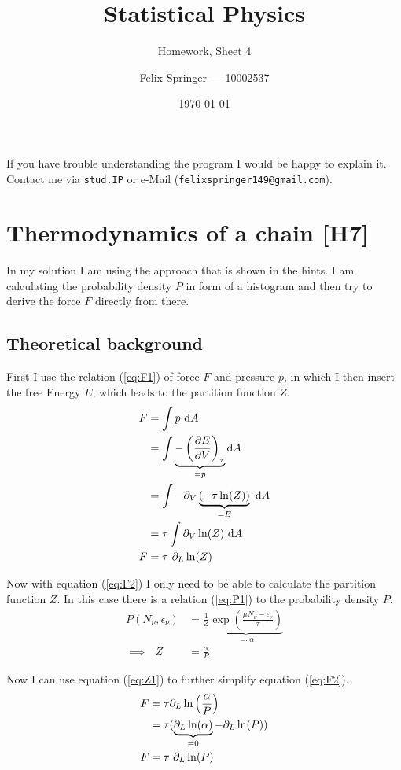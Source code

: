 \documentclass[a4paper,12pt]{scrartcl}
\title{Statistical Physics}
\subtitle{Homework, Sheet 4}
\author{Felix Springer --- 10002537}
\date{\today}
\begin{document}
\maketitle

If you have trouble understanding the program I would be happy to explain it.
Contact me via \texttt{stud.IP} or e-Mail (\texttt{felixspringer149@gmail.com}).

\section{Thermodynamics of a chain [H7]}
In my solution I am using the approach that is shown in the hints.
I am calculating the probability density $P$ in form of a histogram and then try to derive the force $F$ directly from there.

\subsection{Theoretical background}
First I use the relation (\ref{eq:F1}) of force $F$ and pressure $p$, in which I then insert the free Energy $E$, which leads to the partition function $Z$.
\begin{align}
	F &= \int p \text{ d}A \label{eq:F1} \\
	&= \int \underbrace{- \left( \frac{\partial E}{\partial V} \right)_{\tau}}_{= p} \text{d}A \notag \\
	&= \int - \partial_V \underbrace{(- \tau \ln(Z))}_{= E} \text{ d}A \notag \\
	&= \tau \int \partial_V \ln(Z) \text{ d}A \notag \\
	F &= \tau \text{ } \partial_L \ln(Z) \label{eq:F2}
\end{align}

Now with equation (\ref{eq:F2}) I only need to be able to calculate the partition function $Z$.
In this case there is a relation (\ref{eq:P1}) to the probability density $P$.
\begin{align}
	P (N_\nu, \epsilon_\nu) &= \frac{1}{Z} \underbrace{\exp \left( {\frac{\mu N_\nu - \epsilon_\nu}{\tau}} \right)}_{\eqqcolon \alpha} \label{eq:P1} \\
	\implies \text{ } Z &= \frac{\alpha}{P} \label{eq:Z1}
\end{align}

Now I can use equation (\ref{eq:Z1}) to further simplify equation (\ref{eq:F2}).
\begin{align}
	F &= \tau \partial_L \ln \left( \frac{\alpha}{P} \right) \notag \\
	&= \tau ( \underbrace{\partial_L \ln(\alpha)}_{= 0} - \partial_L \ln(P) ) \notag \\
	F &= \tau \text{ } \partial_L \ln(P) \label{eq:F3}
\end{align}
\end{document}
